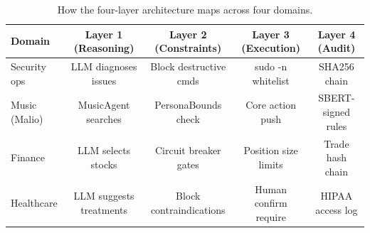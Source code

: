 \documentclass[letterpaper]{article}
\begin{document}
\begin{table}[h]
\centering
\caption{How the four-layer architecture maps across four domains.}
\label{tab:crossdomain}
\begin{tabular}{lcccc}
\toprule
Domain & Layer 1 (Reasoning) & Layer 2 (Constraints) & Layer 3 (Execution) & Layer 4 (Audit) \\
\midrule
Security ops & LLM diagnoses issues & Block destructive cmds & sudo -n whitelist & SHA256 chain \\
Music (Malio) & MusicAgent searches & PersonaBounds check & Core action push & SBERT-signed rules \\
Finance & LLM selects stocks & Circuit breaker gates & Position size limits & Trade hash chain \\
Healthcare & LLM suggests treatments & Block contraindications & Human confirm require & HIPAA access log \\
\bottomrule
\end{tabular}
\end{table}
\end{document}
